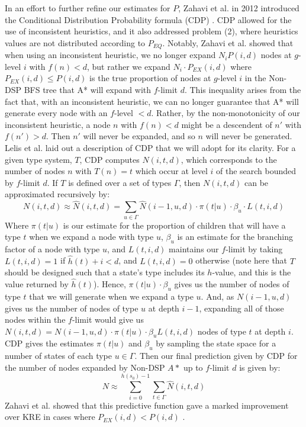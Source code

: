 \documentclass{article}
\begin{document}
In an effort to further refine our estimates for \(P\), Zahavi et al. in 2012 introduced the Conditional Distribution Probability formula (CDP) \cite{zahavi2010predicting}. CDP allowed for the use of inconsistent heuristics,
and it also addressed problem (2), where heuristics values are not distributed according to \(P_{EQ}\).
Notably, Zahavi et al. showed that when using an inconsistent heuristic, we no longer expand \(N_{i} P(i, d)\)
nodes at \(g\)-level \(i\) with \(f(n) < d\),
but rather we expand \(N_{i} \cdot  P_{EX}(i, d)\) where \(P_{EX}(i, d) \leq P(i, d)\) is the true proportion
of nodes at \(g\)-level \(i\) in the Non-DSP BFS tree that A* will expand with \(f\)-limit \(d\).
This inequality arises from the fact that, with an inconsistent heuristic,
we can no longer guarantee that A* will generate every node
with an \(f\)-level \(< d\). Rather, by the non-monotonicity of our inconsistent heuristic,
a node \(n\) with \(f(n) < d\) might be a descendent of \(n'\) with \(f(n') > d\).
Then \(n'\) will never be expanded, and so \(n\) will never be generated. \\

Lelis et al. \cite{lelis2013predicting} laid out a description of CDP that we will adopt
for its clarity. For a given type system, \(T\),
CDP computes \(N(i,t,d)\), which corresponds to the number of nodes \(n\) with \(T(n) = t\)
which occur at level \(i\) of the search bounded by \(f\)-limit \(d\).
If \(T\) is defined over a set of types \(\Gamma\), then \(N(i,t,d)\) can be approximated recursively by:
\[N(i,t,d) \approx \hat{N}(i,t,d) = \sum_{u \in \Gamma} \hat{N}(i - 1, u, d) \cdot \pi(t | u) \cdot \beta_u \cdot L(t, i, d)\]
Where \(\pi(t | u)\) is our estimate for the proportion of children that will have a type \(t\)
when we expand a node with type \(u\),
\(\beta_u\) is an estimate for the branching factor of a node with type \(u\),
and \(L(t,i,d)\) maintains our \(f\)-limit by taking \(L(t,i,d) = 1\) if \(\hat{h}(t) + i < d\), and
\(L(t,i,d) = 0\) otherwise (note here that \(T\) should be designed such that a state's type includes its \(h\)-value,
and this is the value returned by \(\hat{h}(t)\)).
Hence, \(\pi(t | u) \cdot \beta_u\) gives us the number of nodes of type \(t\) that we will generate when we expand a type \(u\).
And, as \(N(i - 1, u, d)\) gives us the number of nodes of type \(u\) at depth \(i - 1\),
expanding all of those nodes within the \(f\)-limit would give us \(N(i,t,d) = N(i - 1, u, d) \cdot \pi(t | u) \cdot \beta_u L(t,i,d)\) nodes of type \(t\) at depth \(i\).
CDP gives the estimates \(\pi(t | u)\) and \(\beta_u\) by sampling the state space for
a number of states of each type \(u \in \Gamma\).
Then our final prediction given by CDP for the number of nodes expanded by Non-DSP \(A*\) up to \(f\)-limit \(d\) is given by:
\[N \approx \sum_{i=0}^{h(s_0)-1} \sum_{t \in \Gamma}  \hat{N}(i,t,d)\]
Zahavi et al. showed that this predictive function gave a marked improvement over
KRE in cases where \(P_{EX}(i, d) < P(i, d)\) \cite{zahavi2010predicting}. \\
\end{document}
